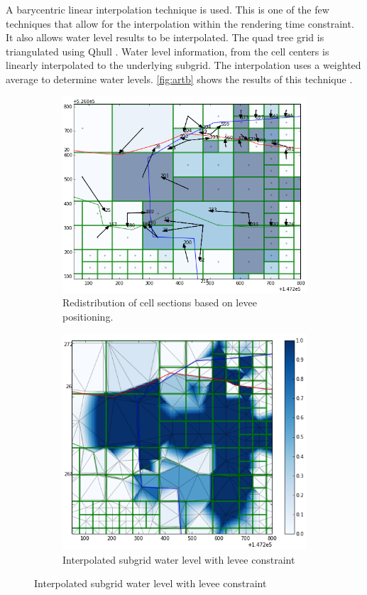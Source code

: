 \documentclass[a4paper]{article}
\begin{document}
A barycentric linear interpolation technique is used. This is one of the few techniques that allow for the interpolation within the rendering time constraint. It also allows water level results to be interpolated. The quad tree grid is triangulated using Qhull \citep{Barber1996}.  Water level information, from the cell centers is linearly interpolated to the underlying subgrid. The interpolation uses a weighted average to determine water levels. \autoref{fig:artb} shows the results of this technique .

\begin{figure}[htbp]
  \centering
  \begin{subfigure}{0.4\textwidth}
    \includegraphics[width=1\textwidth]{levees1}
    \caption{Redistribution of cell sections based on levee positioning.}
    \label{fig:levee1}
  \end{subfigure}
  \begin{subfigure}{0.4\textwidth}
    \includegraphics[width=1\textwidth]{levees2}
    \caption{Interpolated subgrid water level with levee constraint}
    \label{fig:levee2}
  \end{subfigure}
  \label{fig:levees}


\end{figure}
\end{document}

